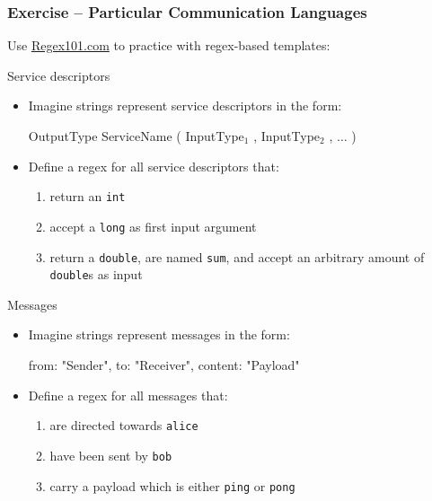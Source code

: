 \documentclass[presentation]{beamer}\mode<presentation>{\usetheme{AMSCesenaPurpleAndGold}}
\begin{document}
\begin{frame}[allowframebreaks]
	\frametitle{Exercise \currentExercise{} -- Particular Communication Languages}
	
	Use \href{https://regex101.com/}{Regex101.com} to practice with regex-based templates:
	
	\begin{block}{Service descriptors}
		\begin{itemize}
			\item Imagine strings represent \alert{service descriptors} in the form:
			\begin{center}\ttfamily\small
				OutputType ServiceName ( InputType$_1$ , InputType$_2$ , $\ldots$ )
			\end{center}
		
			\item Define a regex for all service descriptors that:
			\begin{enumerate}
				\item return an \texttt{int}
				\item accept a \texttt{long} as first input argument
				\item return a \texttt{double}, are named \texttt{sum}, and accept an arbitrary amount of \texttt{double}s as input
			\end{enumerate}
		\end{itemize}
	\end{block}
	
	\begin{block}{Messages}
		\begin{itemize}
			\item Imagine strings represent \alert{messages} in the form:
			\begin{center}\ttfamily\small
				from: "Sender", to: "Receiver", content: "Payload"
			\end{center}
			
			\item Define a regex for all messages that:
			\begin{enumerate}
				\item are directed towards \texttt{alice}
				\item have been sent by \texttt{bob}
				\item carry a payload which is either \texttt{ping} or \texttt{pong}
			\end{enumerate}
		\end{itemize}
	\end{block}

\end{frame}
\end{document}
